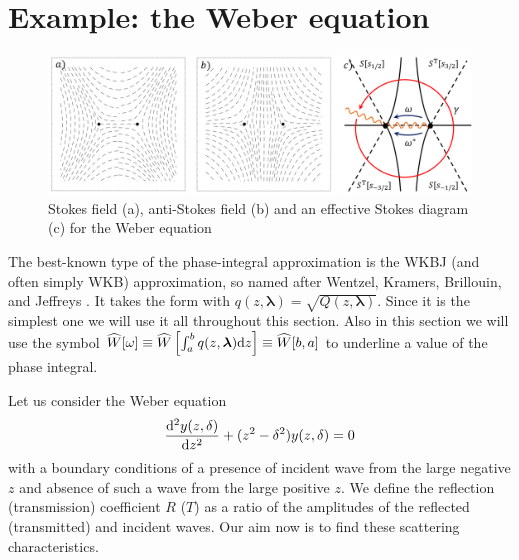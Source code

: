 \documentclass[12pt]{iopart}
\def\W{\widehat{W}}
\def\lmbd{\bm{\lambda}}
\def\w{\omega}
\newcommand\phsintgrnd[1][z]{q(#1,\lmbd)}
\newcommand\phsintgrl[3][z]{\int_{#2}^{#3} \phsintgrnd[#1] \rmd #1}
\begin{document}
\section{Example: the Weber equation \label{sec:weber}}

\begin{figure}
\centering
\noindent
\includegraphics[width=\textwidth]{stuff/wsd.png}
\caption{Stokes field (a), anti-Stokes field (b) and an effective Stokes diagram (c) 
for the Weber equation }
\label{fig:wsd}
\end{figure} 

The best-known type of the phase-integral approximation is the WKBJ (and often simply WKB) approximation, 
so named after Wentzel, Kramers, Brillouin, and Jeffreys \cite{wkb1,wkb2,wkb3,wkbj}. 
It takes the form  with $\phsintgrnd = \sqrt{Q(z,\lmbd)}$. Since it is the simplest one
we will use it all throughout this section. Also in this section we will use the symbol 
$\W[\w] \equiv \W \left[\phsintgrl{a}{b} \right] \equiv \W[b,a]$ to underline a value of the phase integral. 


Let us consider the Weber equation
\begin{eqnarray}
\frac{\mathrm{d}^2 y(z,\delta)}{\mathrm{d} z^2}+(z^2-\delta^2)y(z,\delta)=0
\label{eq:weber}
\end{eqnarray}
with a boundary conditions of a presence of incident wave from the large negative $z$ and absence of such 
a wave from the large positive $z$. We define the reflection (transmission) coefficient $R$ ($T$) as
a ratio of the amplitudes of the reflected (transmitted) and incident waves. 
Our aim now is to find these scattering characteristics.
\end{document}
